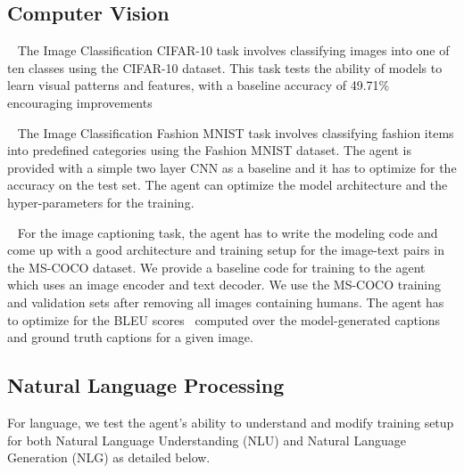 \subsection{Computer Vision}

~\citep{krizhevsky2009learning} The Image Classification CIFAR-10 task involves classifying images into one of ten classes using the CIFAR-10 dataset.
This task tests the ability of models to learn visual patterns and features, with a baseline accuracy of 49.71\% encouraging improvements 

~\citep{xiao2017/online} The Image Classification Fashion MNIST task involves classifying fashion items into predefined categories using the Fashion MNIST dataset. The agent is provided with a simple two layer CNN as a baseline and it has to optimize for the accuracy on the test set. The agent can optimize the model architecture and the hyper-parameters for the training.


~\citep{lin2014microsoft} For the image captioning task, the agent has to write the modeling code and come up with a good architecture and training setup for the image-text pairs in the MS-COCO dataset. We provide a baseline code for training to the agent which uses an image encoder and text decoder. We use the MS-COCO training and validation sets after removing all images containing humans. The agent has to optimize for the BLEU scores~\citep{papineni2002bleu} computed over the model-generated captions and ground truth captions for a given image.


\subsection{Natural Language Processing}

For language, we test the agent's ability to understand and modify training setup for both Natural Language Understanding (NLU) and Natural Language Generation (NLG) as detailed below.

